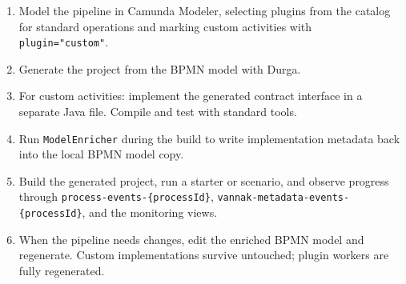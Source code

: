 \begin{enumerate}
\item Model the pipeline in Camunda Modeler, selecting plugins from the catalog for
  standard operations and marking custom activities with \texttt{plugin="custom"}.
\item Generate the project from the BPMN model with Durga.
\item For custom activities: implement the generated contract interface in a separate
  Java file. Compile and test with standard tools.
\item Run \texttt{ModelEnricher} during the build to write implementation metadata
  back into the local BPMN model copy.
\item Build the generated project, run a starter or scenario, and observe progress
  through \texttt{process-events-\{processId\}}, \texttt{vannak-metadata-events-\{processId\}}, and the
  monitoring views.
\item When the pipeline needs changes, edit the enriched BPMN model and regenerate.
  Custom implementations survive untouched; plugin workers are fully regenerated.
\end{enumerate}
